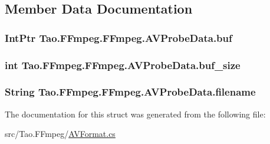 \subsection{Member Data Documentation}
\hypertarget{struct_tao_1_1_f_fmpeg_1_1_f_fmpeg_1_1_a_v_probe_data_acad61a9f491fdf295817a62589e87d69}{
\subsubsection[{buf}]{\setlength{\rightskip}{0pt plus 5cm}IntPtr {\bf Tao.FFmpeg.FFmpeg.AVProbeData.buf}}}
\label{struct_tao_1_1_f_fmpeg_1_1_f_fmpeg_1_1_a_v_probe_data_acad61a9f491fdf295817a62589e87d69}
\hypertarget{struct_tao_1_1_f_fmpeg_1_1_f_fmpeg_1_1_a_v_probe_data_a48cf7f345555a7cf6ba0c45d334e2cba}{
\subsubsection[{buf\_\-size}]{\setlength{\rightskip}{0pt plus 5cm}int {\bf Tao.FFmpeg.FFmpeg.AVProbeData.buf\_\-size}}}
\label{struct_tao_1_1_f_fmpeg_1_1_f_fmpeg_1_1_a_v_probe_data_a48cf7f345555a7cf6ba0c45d334e2cba}
\hypertarget{struct_tao_1_1_f_fmpeg_1_1_f_fmpeg_1_1_a_v_probe_data_af390742215c2c76bbf9854651fe1a86c}{
\subsubsection[{filename}]{\setlength{\rightskip}{0pt plus 5cm}String {\bf Tao.FFmpeg.FFmpeg.AVProbeData.filename}}}
\label{struct_tao_1_1_f_fmpeg_1_1_f_fmpeg_1_1_a_v_probe_data_af390742215c2c76bbf9854651fe1a86c}


The documentation for this struct was generated from the following file:\begin{DoxyCompactItemize}
\item 
src/Tao.FFmpeg/\hyperlink{_a_v_format_8cs}{AVFormat.cs}\end{DoxyCompactItemize}
